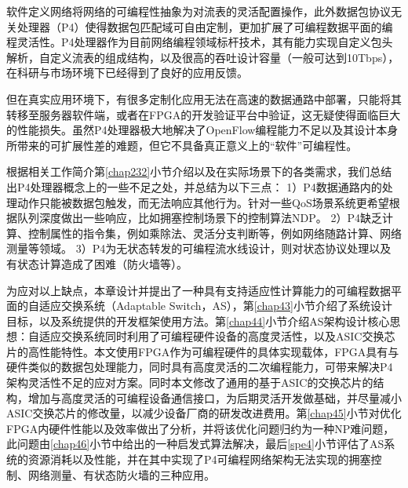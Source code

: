 
 \label{chap4}








软件定义网络将网络的可编程性抽象为对流表的灵活配置操作，此外数据包协议无关处理器（P4）使得数据包匹配域可自由定制，更加扩展了可编程数据平面的编程灵活性。P4处理器作为目前网络编程领域标杆技术，其有能力实现自定义包头解析，自定义流表的组成结构，以及很高的吞吐设计容量（一般可达到10Tbps），在科研与市场环境下已经得到了良好的应用反馈。

但在真实应用环境下，有很多定制化应用无法在高速的数据通路中部署，只能将其转移至服务器软件端，或者在FPGA的开发验证平台中验证，这无疑使得面临巨大的性能损失。虽然P4处理器极大地解决了OpenFlow编程能力不足以及其设计本身所带来的可扩展性差的难题，但它不具备真正意义上的“软件”可编程性。

根据相关工作简介第\ref{chap232}小节介绍以及在实际场景下的各类需求，我们总结出P4处理器概念上的一些不足之处，并总结为以下三点：
1）P4数据通路内的处理动作只能被数据包触发，而无法响应其他行为。针对一些QoS场景系统更希望根据队列深度做出一些响应，比如拥塞控制场景下的控制算法NDP。
2）P4缺乏计算、控制属性的指令集，例如乘除法、灵活分支判断等，例如网络随路计算、网络测量等领域。
3）P4为无状态转发的可编程流水线设计，则对状态协议处理以及有状态计算造成了困难（防火墙等）。

为应对以上缺点，本章设计并提出了一种具有支持适应性计算能力的可编程数据平面的自适应交换系统（Adaptable Switch，AS），第\ref{chap43}小节介绍了系统设计目标，以及系统提供的开发框架使用方法。第\ref{chap44}小节介绍AS架构设计核心思想：自适应交换系统同时利用了可编程硬件设备的高度灵活性，以及ASIC交换芯片的高性能特性。本文使用FPGA作为可编程硬件的具体实现载体，FPGA具有与硬件类似的数据包处理能力，同时具有高度灵活的二次编程能力，可带来解决P4架构灵活性不足的应对方案。同时本文修改了通用的基于ASIC的交换芯片的结构，增加与高度灵活的可编程设备通信接口，为后期灵活开发做基础，并尽量减小ASIC交换芯片的修改量，以减少设备厂商的研发改进费用。第\ref{chap45}小节对优化FPGA内硬件性能以及效率做出了分析，并将该优化问题归约为一种NP难问题，此问题由\ref{chap46}小节中给出的一种启发式算法解决，最后\ref{spe4}小节评估了AS系统的资源消耗以及性能，并在其中实现了P4可编程网络架构无法实现的拥塞控制、网络测量、有状态防火墙的三种应用。



